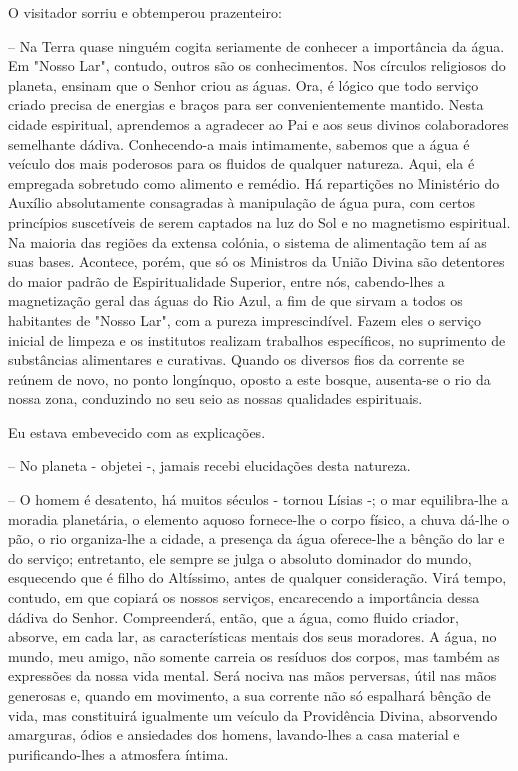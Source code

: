 \documentclass[portuguese,12pt,a4paper]{scrbook}
\begin{document}
	O visitador sorriu e obtemperou prazenteiro:
	
	– Na Terra quase ninguém cogita seriamente de conhecer a importância da água. Em "Nosso Lar", contudo, outros são os conhecimentos. Nos círculos religiosos do planeta, ensinam que o Senhor criou as águas. Ora, é lógico que todo serviço criado precisa de energias e braços para ser convenientemente mantido. Nesta cidade espiritual, aprendemos a agradecer ao Pai e aos seus divinos colaboradores semelhante dádiva. Conhecendo-a mais intimamente, sabemos que a água é veículo dos mais poderosos para os fluidos de qualquer natureza. Aqui, ela é empregada sobretudo como alimento e remédio. Há repartições no Ministério do Auxílio absolutamente consagradas à manipulação de água pura, com certos princípios suscetíveis de serem captados na luz do Sol e no magnetismo espiritual. Na maioria das regiões da extensa colónia, o sistema de alimentação tem aí as suas bases. Acontece, porém, que só os Ministros da União Divina são detentores do maior padrão de Espiritualidade Superior, entre nós, cabendo-lhes a magnetização geral das águas do Rio Azul, a fim de que sirvam a todos os habitantes de "Nosso Lar", com a pureza imprescindível. Fazem eles o serviço inicial de limpeza e os institutos realizam trabalhos específicos, no suprimento de substâncias alimentares e curativas. Quando os diversos fios da corrente se reúnem de novo, no ponto longínquo, oposto a este bosque, ausenta-se o rio da nossa zona, conduzindo no seu seio as nossas qualidades espirituais.
	
	
	Eu estava embevecido com as explicações.
	
	– No planeta - objetei -, jamais recebi elucidações desta natureza.
	
	– O homem é desatento, há muitos séculos - tornou Lísias -; o mar equilibra-lhe a moradia planetária, o elemento aquoso fornece-lhe o corpo físico, a chuva dá-lhe o pão, o rio organiza-lhe a cidade, a presença da água oferece-lhe a bênção do lar e do serviço; entretanto, ele sempre se julga o absoluto dominador do mundo, esquecendo que é filho do Altíssimo, antes de qualquer consideração. Virá tempo, contudo, em que copiará os nossos serviços, encarecendo a importância dessa dádiva do Senhor. Compreenderá, então, que a água, como fluido criador, absorve, em cada lar, as características mentais dos seus moradores. A água, no mundo, meu amigo, não somente carreia os resíduos dos corpos, mas também as expressões da nossa vida mental. Será nociva nas mãos perversas, útil nas mãos generosas e, quando em movimento, a sua corrente não só espalhará bênção de vida, mas constituirá igualmente um veículo da Providência Divina, absorvendo amarguras, ódios e ansiedades dos homens, lavando-lhes a casa material e purificando-lhes a atmosfera íntima.
	
\end{document}
